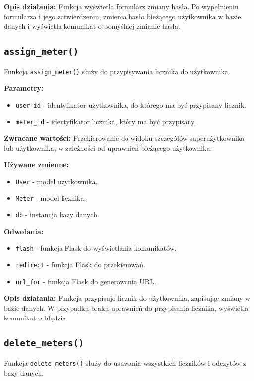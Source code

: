 \documentclass[12pt,a4paper]{report}
\begin{document}
\textbf{Opis działania:}
Funkcja wyświetla formularz zmiany hasła. Po wypełnieniu formularza i jego zatwierdzeniu, zmienia hasło bieżącego użytkownika w bazie danych i wyświetla komunikat o pomyślnej zmianie hasła.

\subsection{\texttt{assign\_meter()}}
\label{sec:assign_meter}
Funkcja \texttt{assign\_meter()} służy do przypisywania licznika do użytkownika.

\textbf{Parametry:}
\begin{itemize}
    \item \texttt{user\_id} - identyfikator użytkownika, do którego ma być przypisany licznik.
    \item \texttt{meter\_id} - identyfikator licznika, który ma być przypisany.
\end{itemize}

\textbf{Zwracane wartości:} Przekierowanie do widoku szczegółów superużytkownika lub użytkownika, w zależności od uprawnień bieżącego użytkownika.

\textbf{Używane zmienne:}
\begin{itemize}
    \item \texttt{User} - model użytkownika.
    \item \texttt{Meter} - model licznika.
    \item \texttt{db} - instancja bazy danych.
\end{itemize}

\textbf{Odwołania:}
\begin{itemize}
    \item \texttt{flash} - funkcja Flask do wyświetlania komunikatów.
    \item \texttt{redirect} - funkcja Flask do przekierowań.
    \item \texttt{url\_for} - funkcja Flask do generowania URL.
\end{itemize}

\textbf{Opis działania:}
Funkcja przypisuje licznik do użytkownika, zapisując zmiany w bazie danych. W przypadku braku uprawnień do przypisania licznika, wyświetla komunikat o błędzie.

\subsection{\texttt{delete\_meters()}}
\label{sec:delete_meters}
Funkcja \texttt{delete\_meters()} służy do usuwania wszystkich liczników i odczytów z bazy danych.
\end{document}
